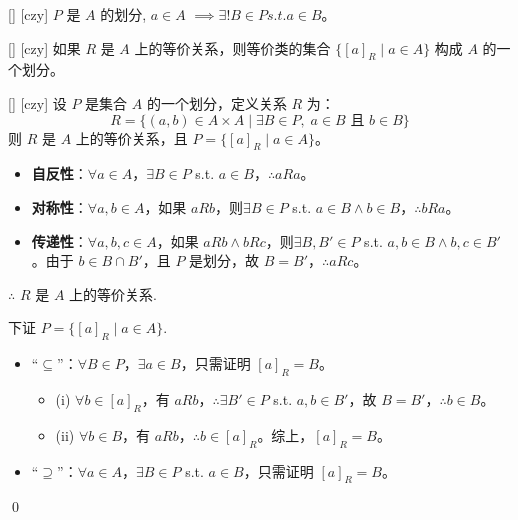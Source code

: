 \documentclass[UTF8]{ctexart}
\begin{document}
        \begin{lma}
            [UUID]
            {}
            []
            [czy]
            \( P \) 是 \( A \) 的划分, \( a \in A \) \(\implies \exists ! B \in P s.t. a \in B \)。
        \end{lma}

        \begin{thm}
            [UUID]
            {}
            []
            [czy]
            如果 \( R \) 是 \( A \) 上的等价关系，则等价类的集合 \( \{ [a]_R \mid a \in A \} \) 构成 \( A \) 的一个划分。
        \end{thm}
        
        \begin{thm}
            [UUID]
            {}
            []
            [czy]
            设 \( P \) 是集合 \( A \) 的一个划分，定义关系 \( R \) 为：
            \[
            R = \{ (a, b) \in A \times A \mid \exists B \in P, \; a \in B \text{ 且 } b \in B \}
            \]
            则 \( R \) 是 \( A \) 上的等价关系，且 \( P = \{ [a]_R \mid a \in A \} \)。
        \end{thm}

        \begin{prf}
            \begin{itemize}
                \item \textbf{自反性}：\(\forall a \in A \)，\(\exists B \in P \) s.t. \( a \in B \)，\(\therefore a R a \)。
                \item \textbf{对称性}：\(\forall a, b \in A \)，如果 \( a R b \)，则\(\exists B \in P \) s.t. \( a \in B \land b \in B \)，\(\therefore b R a \)。
                \item \textbf{传递性}：\(\forall a, b, c \in A \)，如果 \( a R b \land b R c \)，则\(\exists B, B' \in P \) s.t. \( a, b \in B \land b, c \in B' \)。由于 \( b \in B \cap B' \)，且 \( P \) 是划分，故 \( B = B' \)，\(\therefore a R c \)。
            \end{itemize}

            \(\therefore\) \( R \) 是 \( A \) 上的等价关系.

            下证 \( P = \{ [a]_R \mid a \in A \} \).

            \begin{itemize}
                \item “\(\subseteq\)”：\(\forall B \in P \)，\(\exists a \in B \)，只需证明 \( [a]_R = B \)。
                \begin{itemize}
                    \item (i) \(\forall b \in [a]_R \)，有 \( a R b \)，\(\therefore \exists B' \in P \) s.t. \( a, b \in B' \)，故 \( B = B' \)，\(\therefore b \in B \)。
                    \item (ii) \(\forall b \in B \)，有 \( a R b \)，\(\therefore b \in [a]_R \)。综上，\( [a]_R = B \)。
                \end{itemize}
                \item “\(\supseteq\)”：\(\forall a \in A \)，\(\exists B \in P \) s.t. \( a \in B \)，只需证明 \( [a]_R = B \)。
            \end{itemize}
            \qed
        \end{prf}
\end{document}
